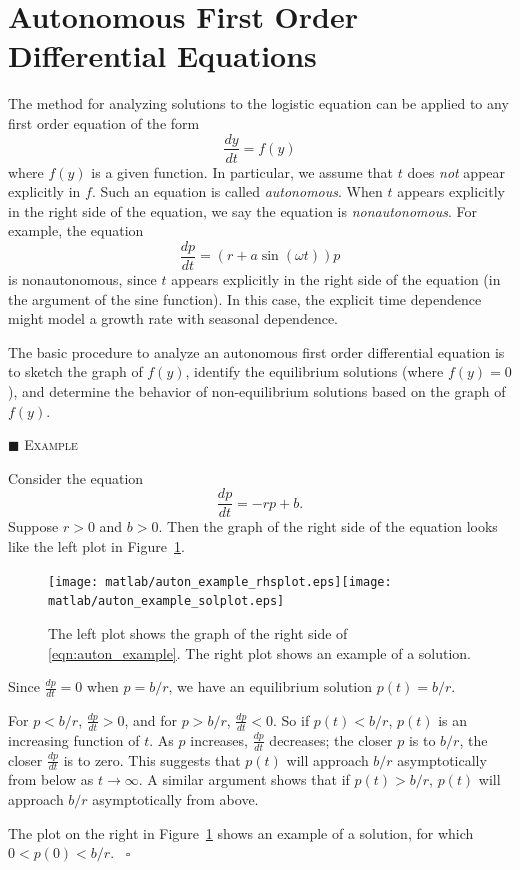 \documentclass[reqno]{immbook}
\numberwithin{equation}{chapter}
\numberwithin{question}{section}
\numberwithin{theorem}{chapter}
\numberwithin{figure}{chapter}
\theoremstyle{definition}
\newenvironment{xexample}%
{%

\medskip\noindent\addtocounter{example}{1}$\blacksquare$ \textsc{Example \theexample}\hspace*{1em}%
}%
{%
~\hfill$\square$

\medskip
}
\begin{document}
\section{Autonomous First Order Differential Equations}
The method for analyzing solutions to the logistic equation can be
applied to any first order equation of the form
\begin{equation}
   \frac{dy}{dt} = f(y)
\end{equation}
where $f(y)$ is a given function.
In particular, we assume that $t$ does \emph{not} appear explicitly
in $f$.  Such an equation is called \emph{autonomous}.
When $t$ appears explicitly in the right side of the equation,
we say the equation is \emph{nonautonomous}.
For example, the equation
\begin{equation}
  \frac{dp}{dt} = (r+a \sin(\omega t))p
\end{equation}
is nonautonomous, since $t$ appears explicitly in the right side of the
equation (in the argument of the sine function).
In this case, the explicit time dependence might model a growth
rate with seasonal dependence.

The basic procedure to analyze an autonomous
first order differential equation is to sketch the graph of $f(y)$, identify
the equilibrium solutions (where $f(y)=0$), and determine the
behavior of non-equilibrium solutions based on the graph
of $f(y)$.

\begin{xexample}
Consider the equation
\begin{equation}
\frac{dp}{dt} = -rp + b.
\label{eqn:auton_example}
\end{equation}
Suppose $r > 0$ and $b > 0$.
Then the graph of the right side of the equation looks like
the left plot in Figure~\ref{fig:auton_example_plots}.
\begin{figure}
\centerline{\texttt{[image: matlab/auton\_example\_rhsplot.eps]}\hspace{0.25in}\texttt{[image: matlab/auton\_example\_solplot.eps]}}
\caption{The left plot shows the graph of the right side of \eqref{eqn:auton_example}.
The right plot shows an example of a solution.}
\label{fig:auton_example_plots}
\end{figure}
Since $\frac{dp}{dt} = 0$ when $p = b/r$, we have an
equilibrium solution $p(t) = b/r$.

For $p < b/r$, $\frac{dp}{dt} > 0$, and for
$p > b/r$, $\frac{dp}{dt} < 0$.
So if $p(t) < b/r$, $p(t)$ is an increasing function of
$t$.  As $p$ increases, $\frac{dp}{dt}$ decreases; the closer
$p$ is to $b/r$, the closer $\frac{dp}{dt}$
is to zero.
This suggests that $p(t)$ will approach $b/r$ asymptotically
from below as $t\rightarrow\infty$.
A similar argument shows that if $p(t) > b/r$,
$p(t)$ will approach $b/r$ asymptotically from above.

The plot on the right in Figure~\ref{fig:auton_example_plots}
shows an example of a solution, for which $0 < p(0) < b/r$.
\end{xexample}
\end{document}

